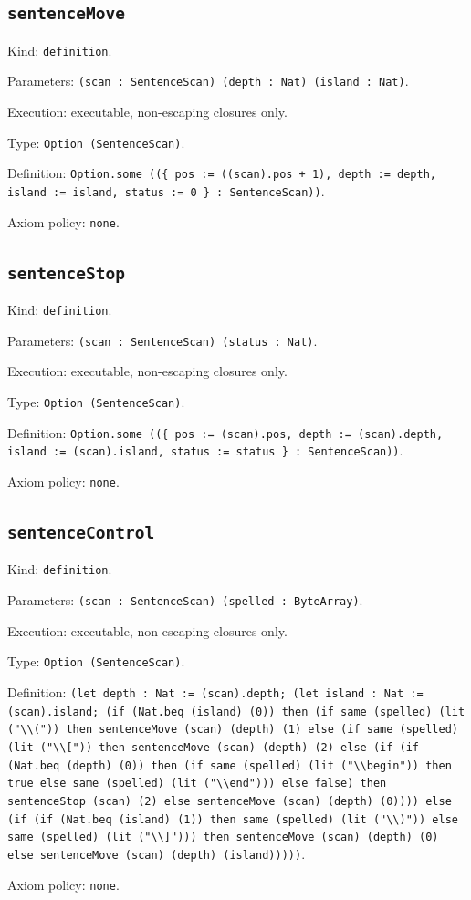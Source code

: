 \documentclass[11pt]{article}
\begin{document}
\subsection*{\texttt{sentenceMove}}
\noindent Kind: \texttt{definition}.\par
\noindent Parameters: \texttt{(scan : SentenceScan) (depth : Nat) (island : Nat)}.\par
\noindent Execution: executable, non-escaping closures only.\par
\noindent Type: \texttt{Option (SentenceScan)}.\par
\noindent Definition: \texttt{Option.some ((\{ pos := ((scan).pos + 1), depth := depth, island := island, status := 0 \} : SentenceScan))}.\par
\noindent Axiom policy: \texttt{none}.\par
\subsection*{\texttt{sentenceStop}}
\noindent Kind: \texttt{definition}.\par
\noindent Parameters: \texttt{(scan : SentenceScan) (status : Nat)}.\par
\noindent Execution: executable, non-escaping closures only.\par
\noindent Type: \texttt{Option (SentenceScan)}.\par
\noindent Definition: \texttt{Option.some ((\{ pos := (scan).pos, depth := (scan).depth, island := (scan).island, status := status \} : SentenceScan))}.\par
\noindent Axiom policy: \texttt{none}.\par
\subsection*{\texttt{sentenceControl}}
\noindent Kind: \texttt{definition}.\par
\noindent Parameters: \texttt{(scan : SentenceScan) (spelled : ByteArray)}.\par
\noindent Execution: executable, non-escaping closures only.\par
\noindent Type: \texttt{Option (SentenceScan)}.\par
\noindent Definition: \texttt{(let depth : Nat := (scan).depth; (let island : Nat := (scan).island; (if (Nat.beq (island) (0)) then (if same (spelled) (lit ("\textbackslash{}\textbackslash{}(")) then sentenceMove (scan) (depth) (1) else (if same (spelled) (lit ("\textbackslash{}\textbackslash{}[")) then sentenceMove (scan) (depth) (2) else (if (if (Nat.beq (depth) (0)) then (if same (spelled) (lit ("\textbackslash{}\textbackslash{}begin")) then true else same (spelled) (lit ("\textbackslash{}\textbackslash{}end"))) else false) then sentenceStop (scan) (2) else sentenceMove (scan) (depth) (0)))) else (if (if (Nat.beq (island) (1)) then same (spelled) (lit ("\textbackslash{}\textbackslash{})")) else same (spelled) (lit ("\textbackslash{}\textbackslash{}]"))) then sentenceMove (scan) (depth) (0) else sentenceMove (scan) (depth) (island)))))}.\par
\noindent Axiom policy: \texttt{none}.\par
\end{document}
